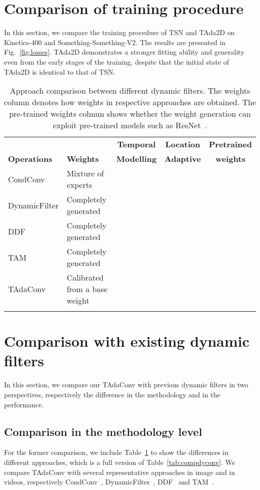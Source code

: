 \documentclass{article} \usepackage{iclr2022_conference,times}
\newcommand{\cmark}{\color{forestgreen}\ding{51}}\newcommand{\xmark}{\color{red}\ding{55}}\usepackage{pifont}
\newcommand{\tablestyle}[2]{\setlength{\tabcolsep}{#1}\renewcommand{\arraystretch}{#2}\centering\small}
\begin{document}
\section{Comparison of training procedure}
\label{appendix:trainingprocedure}
In this section, we compare the training procedure of TSN and TAda2D on Kinetics-400 and Something-Something-V2. The results are presented in Fig.~\ref{fig:losses}. TAda2D demonstrates a stronger fitting ability and generality even from the early stages of the training, despite that the initial state of TAda2D is identical to that of TSN.

\begin{table}[t]
    \tablestyle{3pt}{1.0}
\vspace{-1.5em}
\caption{Approach comparison between different dynamic filters. The weights column denotes how weights in respective approaches are obtained. The pre-trained weights colmun shows whether the weight generation can exploit pre-trained models such as ResNet~\citep{resnet}. 
}
\centering
\begin{tabular}{llccc}
\shline
 ~ & ~ & \textbf{Temporal} &  \textbf{Location} & \textbf{Pretrained}\\
\textbf{Operations} & \textbf{Weights} & \textbf{Modelling} & \textbf{Adaptive} & \textbf{weights}\\
\hline
 CondConv & Mixture of experts  &\xmark & \xmark & \xmark \\
 DynamicFilter & Completely generated  &\xmark & \xmark & \xmark \\
 DDF & Completely generated  & \xmark & \cmark & \xmark \\
 TAM & Completely generated  & \cmark & \xmark & \xmark \\
 TAdaConv & Calibrated from a base weight & \cmark & \cmark & \cmark \\
\shline
\end{tabular}
\label{tab:compdyconvfull}
\end{table}

\section{Comparison with existing dynamic filters}
\label{appendix:comparisondynamicfilter}

In this section, we compare our TAdaConv with previous dynamic filters in two perspectives, respectively the difference in the methodology and in the performance.
\subsection{Comparison in the methodology level}
For the former comparison, we include Table~\ref{tab:compdyconvfull} to show the differences in different approaches, which is a full version of Table~\ref{tab:compdyconv}. We compare TAdaConv with several representative approaches in image and in videos, respectively CondConv~\citep{condconv}, DynamicFilter~\citep{dynamicfilter}, DDF~\citep{ddf} and TAM~\citep{tam}.
\end{document}
